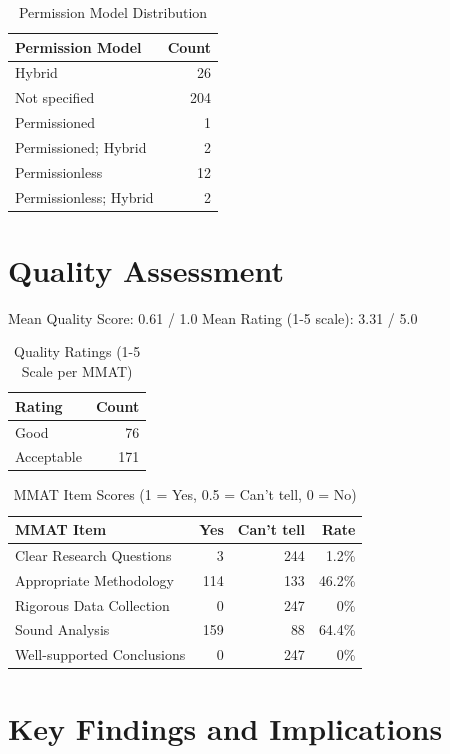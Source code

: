 \documentclass{article}
\begin{document}
\begin{table}[htbp]
\centering
\caption{Permission Model Distribution}
\begin{tabular}{lr}
\toprule
Permission Model & Count \\
\midrule
Hybrid & 26 \\
Not specified & 204 \\
Permissioned & 1 \\
Permissioned; Hybrid & 2 \\
Permissionless & 12 \\
Permissionless; Hybrid & 2 \\
\bottomrule
\end{tabular}
\end{table}

\section{Quality Assessment}

Mean Quality Score: 0.61 / 1.0
Mean Rating (1-5 scale): 3.31 / 5.0

\begin{table}[htbp]
\centering
\caption{Quality Ratings (1-5 Scale per MMAT)}
\begin{tabular}{lr}
\toprule
Rating & Count \\
\midrule
Good & 76 \\
Acceptable & 171 \\
\bottomrule
\end{tabular}
\end{table}

\begin{table}[htbp]
\centering
\caption{MMAT Item Scores (1 = Yes, 0.5 = Can't tell, 0 = No)}
\begin{tabular}{lrrr}
\toprule
MMAT Item & Yes & Can't tell & Rate \\
\midrule
Clear Research Questions & 3 & 244 & 1.2\% \\
Appropriate Methodology & 114 & 133 & 46.2\% \\
Rigorous Data Collection & 0 & 247 & 0\% \\
Sound Analysis & 159 & 88 & 64.4\% \\
Well-supported Conclusions & 0 & 247 & 0\% \\
\bottomrule
\end{tabular}
\end{table}

\section{Key Findings and Implications}
\end{document}
